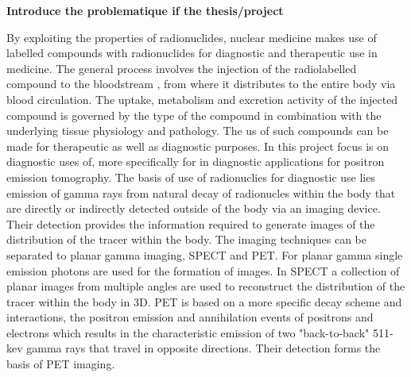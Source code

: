\textbf{Introduce the problematique if the thesis/project}

By exploiting the properties of radionuclides, nuclear medicine makes use of labelled compounds with radionuclides for diagnostic and therapeutic use in medicine. The general process involves the injection of the radiolabelled compound to the bloodstream , from where it distributes to the entire body via blood circulation. The uptake, metabolism and excretion activity of the injected compound is governed by the type of the compound in combination with the underlying tissue physiology and pathology. 
The us of such compounds can be made for therapeutic as well as diagnostic purposes. In this project focus is on diagnostic uses of, more specifically for in diagnostic applications for positron emission tomography. 
The basis of use of radionuclies for diagnostic use lies emission of gamma rays from natural decay of radionucles within the body that are directly or indirectly detected outside of the body via an imaging device. Their detection provides the information required to generate images of the distribution of the tracer within the body. The imaging techniques can be separated to planar gamma imaging, SPECT and PET. For planar gamma single emission photons are used for the formation of images. In SPECT a collection of planar images from multiple angles are used to reconstruct the distribution of the tracer within the body in 3D. 
PET is based on a more specific decay scheme and interactions, the positron emission and annihilation events of positrons and electrons which results in the characteristic emission of two "back-to-back" 511-kev gamma rays that travel in opposite directions. Their detection forms the basis of PET imaging. 


